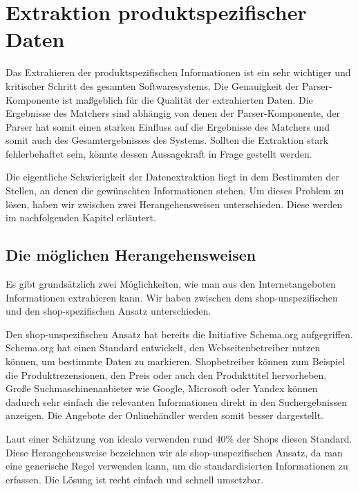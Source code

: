 \section{Extraktion produktspezifischer Daten}
\label{sec:extraktion-produktspezifischer-daten}

Das Extrahieren der produktspezifischen Informationen ist ein sehr wichtiger und kritischer Schritt des gesamten
Softwaresystems.
Die Genauigkeit der Parser-Komponente ist maßgeblich für die Qualität der extrahierten Daten.
Die Ergebnisse des Matchers sind abhängig von denen der Parser-Komponente, der Parser hat somit einen starken
Einfluss auf die Ergebnisse des Matchers und somit auch des Gesamtergebnisses des Systems.
Sollten die Extraktion stark fehlerbehaftet sein, könnte dessen Aussagekraft in Frage gestellt werden.

Die eigentliche Schwierigkeit der Datenextraktion liegt in dem Bestimmten der Stellen, an denen die gewünschten
Informationen stehen.
Um dieses Problem zu lösen, haben wir zwischen zwei Herangehensweisen unterschieden.
Diese werden im nachfolgenden Kapitel erläutert.

\subsection{Die möglichen Herangehensweisen}
\label{subsec:herangehensweisen}

\begin{comment}
    schema.org
\end{comment}
Es gibt grundsätzlich zwei Möglichkeiten, wie man aus den Internetangeboten Informationen extrahieren kann.
Wir haben zwischen dem shop-unspezifischen und den shop-spezifischen Ansatz unterschieden.

Den shop-unspezifischen Ansatz hat bereits die Initiative Schema.org aufgegriffen.
Schema.org hat einen Standard entwickelt, den Webseitenbetreiber nutzen können, um bestimmte
Daten zu markieren.
Shopbetreiber können zum Beispiel die Produktrezensionen, den Preis oder auch den Produkttitel hervorheben.
Große Suchmaschinenanbieter wie Google, Microsoft oder Yandex können dadurch sehr einfach die relevanten Informationen
direkt in den Suchergebnissen anzeigen.
Die Angebote der Onlinehändler werden somit besser dargestellt.

Laut einer Schätzung von idealo verwenden rund 40\% der Shops diesen Standard.
Diese Herangehensweise bezeichnen wir als shop-unspezifischen Ansatz, da man eine generische Regel verwenden kann,
um die standardisierten Informationen zu erfassen.
Die Lösung ist recht einfach und schnell umsetzbar.


